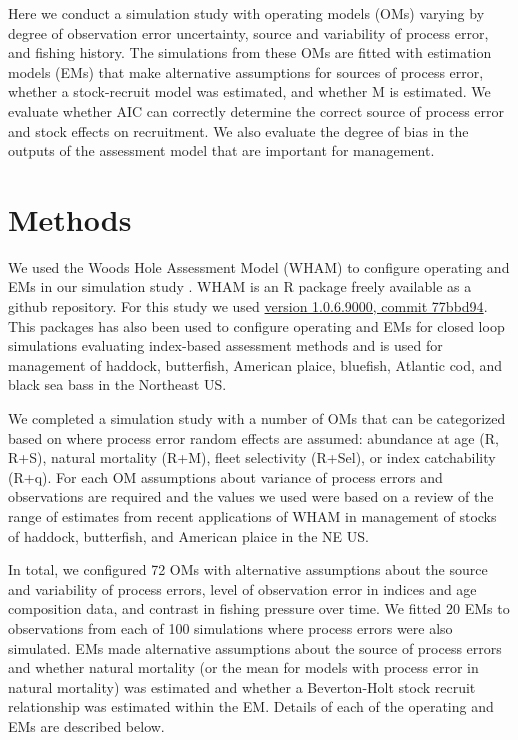 \documentclass[
  12pt,
]{article}
\begin{document}
Here we conduct a simulation study with operating models (OMs) varying
by degree of observation error uncertainty, source and variability of
process error, and fishing history. The simulations from these OMs are
fitted with estimation models (EMs) that make alternative assumptions
for sources of process error, whether a stock-recruit model was
estimated, and whether M is estimated. We evaluate whether AIC can
correctly determine the correct source of process error and stock
effects on recruitment. We also evaluate the degree of bias in the
outputs of the assessment model that are important for management.

\hypertarget{methods}{%
\section*{Methods}\label{methods}}

We used the Woods Hole Assessment Model (WHAM) to configure operating
and EMs in our simulation study \citep[]{millerstock20,stockmiller21}.
WHAM is an R package freely available as a github repository. For this
study we used
\href{https://github.com/timjmiller/wham/tree/77bbd946e4881216a439933473d1c58b21c270c3}{version
1.0.6.9000, commit 77bbd94}. This packages has also been used to
configure operating and EMs for closed loop simulations evaluating
index-based assessment methods \citep{legaultetal23} and is used for
management of haddock, butterfish, American plaice, bluefish, Atlantic
cod, and black sea bass in the Northeast US.

We completed a simulation study with a number of OMs that can be
categorized based on where process error random effects are assumed:
abundance at age (R, R+S), natural mortality (R+M), fleet selectivity
(R+Sel), or index catchability (R+q). For each OM assumptions about
variance of process errors and observations are required and the values
we used were based on a review of the range of estimates from recent
applications of WHAM in management of stocks of haddock, butterfish, and
American plaice in the NE US.

In total, we configured 72 OMs with alternative assumptions about the
source and variability of process errors, level of observation error in
indices and age composition data, and contrast in fishing pressure over
time. We fitted 20 EMs to observations from each of 100 simulations
where process errors were also simulated. EMs made alternative
assumptions about the source of process errors and whether natural
mortality (or the mean for models with process error in natural
mortality) was estimated and whether a Beverton-Holt stock recruit
relationship was estimated within the EM. Details of each of the
operating and EMs are described below.
\end{document}
